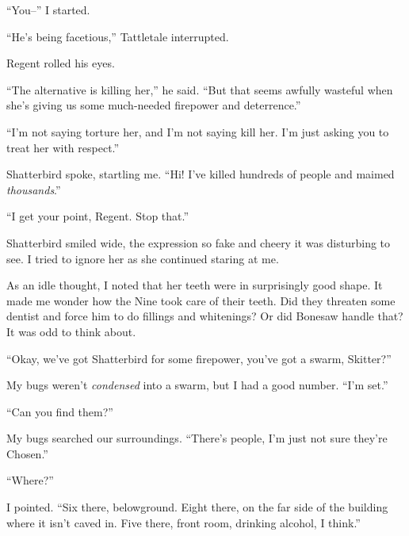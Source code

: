 ``You--'' I started.



``He's being facetious,'' Tattletale interrupted.



Regent rolled his eyes.



``The alternative is killing her,'' he said.  ``But that seems awfully wasteful when she's giving us some much-needed firepower and deterrence.''



``I'm not saying torture her, and I'm not saying kill her.  I'm just asking you to treat her with respect.''



Shatterbird spoke, startling me.  ``Hi!  I've killed hundreds of people and maimed \emph{thousands}.''



``I get your point, Regent.  Stop that.''



Shatterbird smiled wide, the expression so fake and cheery it was disturbing to see.  I tried to ignore her as she continued staring at me.



As an idle thought, I noted that her teeth were in surprisingly good shape.  It made me wonder how the Nine took care of their teeth.  Did they threaten some dentist and force him to do fillings and whitenings?  Or did Bonesaw handle that?  It was odd to think about.



``Okay, we've got Shatterbird for some firepower, you've got a swarm, Skitter?''



My bugs weren't \emph{condensed} into a swarm, but I had a good number.  ``I'm set.''



``Can you find them?''



My bugs searched our surroundings.  ``There's people, I'm just not sure they're Chosen.''



``Where?''



I pointed.  ``Six there, belowground.  Eight there, on the far side of the building where it isn't caved in.  Five there, front room, drinking alcohol, I think.''



